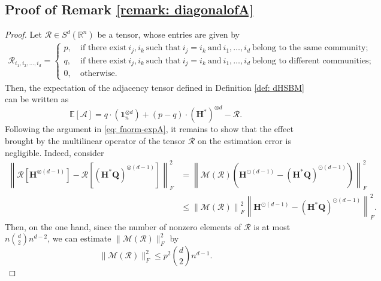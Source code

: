 \documentclass{article}
\theoremstyle{plain}
\theoremstyle{definition}
\theoremstyle{remark}
\newcommand{\Br}{\mathbb{R}}
\newcommand{\BH}{\bm{H}}
\newcommand{\BQ}{\bm{Q}}
\newcommand{\OCal}{\mathcal{O}}
\newcommand{\MCal}{\mathcal{M}}
\newcommand{\ACal}{\mathcal{A}}
\newcommand{\RCal}{\mathcal{R}}
\newcommand{\EE}{{\mathbb{E}}}
\def\b1{\bm{1}}
\begin{document}
\begin{appendix}
\begin{center}
\section{Proof of Remark \ref{remark: diagonalofA}}
\begin{proof}\label{proof: remark4.4}
            Let $\RCal \in S^d(\Br^n)$ be a tensor, whose entries are given by
	\begin{align*}
		\RCal_{i_1,i_2,\ldots,i_d} =
		\begin{cases}
            p,~&\text{if~there~exist}~i_j,i_k~\text{such~that}~i_j=i_k~\text{and}~
			i_1,\ldots,i_d~\text{belong~to~the~same~community};\\
			q,& \text{if~there~exist}~i_j,i_k~\text{such~that}~i_j=i_k~\text{and}~
			i_1,\ldots,i_d~\text{belong~to~different~communities};\\
			0,&\text{otherwise.}
		\end{cases}
	\end{align*}
	Then, the expectation of the adjacency tensor defined in Definition \ref{def: dHSBM} can be written as
	\begin{equation}
		\EE[\ACal] = q\cdot \left(\b1_n^{\otimes d}\right) + (p-q)\cdot \left(\BH^* \right)^{\otimes d} - \RCal.
	\end{equation}
	Following the argument in \eqref{eq: fnorm-expA}, it remains to show that the effect brought by the multilinear operator of the tensor $\RCal$ on the estimation error is negligible. Indeed, consider
	\begin{align}
		\left\| \RCal\left[\bm{H}^{\otimes (d-1)}\right] - \RCal\left[ (\bm{H}^*\BQ)^{\otimes (d-1)}\right] \right\|_F^2 \nonumber & = \left\| \MCal( \RCal) \left(\bm{H}^{\odot (d-1)} - (\bm{H}^*\bm{Q})^{\odot (d-1)} \right) \right\|_F^2\nonumber\\
		& \leq \left\| \MCal( \RCal) \right\|_F^2 \left\| \bm{H}^{\odot (d-1)} - (\bm{H}^*\bm{Q})^{\odot (d-1)} \right\|_F^2. \label{eq:diag-res}%
	\end{align}
	Then, on the one hand, since the number of nonzero elements of $\RCal$ is at most $n\binom{d}{2}n^{d-2}$, we can estimate $\|\MCal(\RCal)\|_F^2$ by
	\begin{equation*}
		\|\MCal (\RCal) \|_F^2 \le p^2 \binom{d}{2}n^{d-1}.

\end{equation*}
\end{proof}
\end{center}
\end{appendix}
\end{document}
